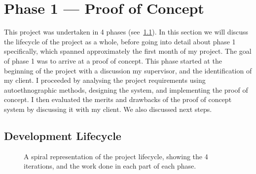 \chapter{Phase 1 --- Proof of Concept}
This project was undertaken in 4 phases (see~\ref{c1:lifecycle}). In this section we will discuss the lifecycle of the project as a whole, before going into detail about phase 1 specifically, which spanned approximately the first month of my project. The goal of phase 1 was to arrive at a proof of concept. This phase started at the beginning of the project with a discussion my supervisor, and the identification of my client. I proceeded by analysing the project requirements using autoethnographic methods, designing the system, and implementing the proof of concept. I then evaluated the merits and drawbacks of the proof of concept system by discussing it with my client. We also discussed next steps. 

\section{Development Lifecycle}
\label{c1:lifecycle}
\begin{figure}[t]
  \centering
  \caption{A spiral representation of the project lifecycle, showing the 4 iterations, and the work done in each part of each phase. }\label{fig:spiral}
\end{figure}

